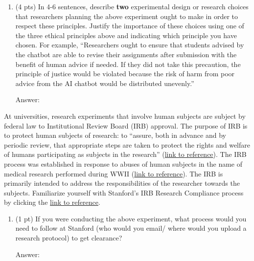 \documentclass{article}
\begin{document}
\begin{enumerate}
    \item[(a)] {(4 pts)} In 4-6 sentences, describe \textbf{two} experimental  design or research choices that researchers planning the above experiment ought to make in order to respect these principles. Justify the importance of these choices using one of the three ethical principles above and indicating which principle you have chosen. For example, “Researchers ought to ensure that students advised by the chatbot are able to revise their assignments after submission with the benefit of human advice if needed. If they did not take this precaution, the principle of justice would be violated because the risk of harm from poor advice from the AI chatbot would be distributed unevenly.” 
\begin{tcolorbox}[breakable]
Answer: 
\end{tcolorbox}
\end{enumerate}

\clearpage

At universities, research experiments that involve human subjects are subject by federal law to Institutional Review Board (IRB) approval.  The purpose of IRB is to protect human subjects of research: to “assure, both in advance and by periodic review, that appropriate steps are taken to protect the rights and welfare of humans participating as subjects in the research” (\href{https://www.fda.gov/about-fda/center-drug-evaluation-and-research-cder/institutional-review-boards-irbs-and-protection-human-subjects-clinical-trials}{link to reference}). The IRB process was established in response to abuses of human subjects in the name of medical research performed during WWII (\href{https://www.hhs.gov/ohrp/regulations-and-policy/belmont-report/read-the-belmont-report/index.html#xethical}{link to reference}). The IRB is primarily intended to address the responsibilities of the researcher towards the subjects. Familiarize yourself with Stanford’s IRB Research Compliance process by clicking the \href{https://researchcompliance.stanford.edu/panels/hs/forms/for-researchers#need}{link to reference}.

\begin{enumerate}
    \item[(b)] {(1 pt)} If you were conducting the above experiment, what process would you need to follow at Stanford (who would you email/ where would you upload a research protocol) to get clearance? 
\begin{tcolorbox}[breakable]
Answer: 
\end{tcolorbox}
\end{enumerate}
\end{document}

